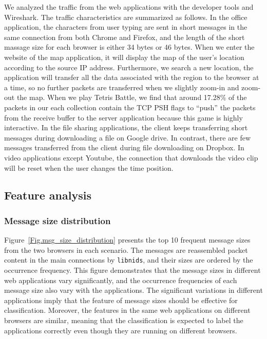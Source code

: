 \documentclass[preprint,12pt]{elsarticle}
\begin{document}
We analyzed the traffic from the web applications with the developer tools and Wireshark. The traffic characteristics are summarized as follows. In the office application, the characters from user typing are sent in short messages in the same connection from both Chrome and Firefox, and the length of the short massage size for each browser is either 34 bytes or 46 bytes. When we enter the website of the map application, it will display the map of the user's location according to the source IP address. Furthermore, we search a new location, the application will transfer all the data associated with the region to the browser at a time, so no further packets are transferred when we slightly zoom-in and zoom-out the map. When we play Tetris Battle, we find that around 17.28\% of the packets in our each collection contain the TCP PSH flags to ``push'' the packets from the receive buffer to the server application because this game is highly interactive. In the file sharing applications, the client keeps transferring short messages during downloading a file on Google drive. In contrast, there are few messages transferred from the client during file downloading on Dropbox. In video applications except Youtube, the connection that downloads the video clip will be reset when the user changes the time position. 


\subsection{Feature analysis}
\label{sec:feature analysis}
\subsubsection{Message size distribution}
Figure~\ref{Fig.msg_size_distribution} presents the top 10 frequent message sizes from the two browsers in each scenario. The messages are reassembled packet content in the main connections by \texttt{libnids}, and their sizes are ordered by the occurrence frequency. This figure demonstrates that the message sizes in different web applications vary significantly, and the occurrence frequencies of each message size also vary with the applications. The significant variations in different applications imply that the feature of message sizes should be effective for classification. Moreover, the features in the same web applications on different browsers are similar, meaning that the classification is expected to label the applications correctly even though they are running on different browsers.  
\end{document}
